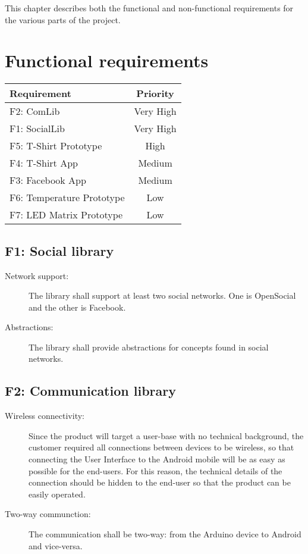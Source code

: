 
This chapter describes both the functional and non-functional requirements
for the various parts of the project.

\section{Functional requirements}

\begin{tabular}{ | l | c | }
	\hline                        
	\bf{Requirement} & \bf{Priority} \\
	\hline
	F2: ComLib & Very High \\
	F1: SocialLib & Very High \\
	F5: T-Shirt Prototype & High \\
	F4: T-Shirt App & Medium \\
	F3: Facebook App & Medium \\
	F6: Temperature Prototype & Low \\
	F7: LED Matrix Prototype & Low \\
	\hline  
\end{tabular}

	\subsection{F1: Social library}
	\begin{description}
		\item[Network support:] The library shall support at least two social networks.
		One is OpenSocial and the other is Facebook.
		\item[Abstractions:] The library shall provide abstractions for concepts found
		in social networks.
	\end{description}
	
	\subsection{F2: Communication library}
	\begin{description}
		\item[Wireless connectivity:] Since the product will target a user-base with
		no technical background, the customer required all connections between
		devices to be wireless, so that connecting the User Interface to the Android
		mobile will be as easy as possible for the end-users. For this reason, the technical
		details of the connection should be hidden to the end-user so that the product can
		be easily operated.
		\item[Two-way communction:] The communication shall be two-way: from the
		Arduino device to Android and vice-versa.
	\end{description}

